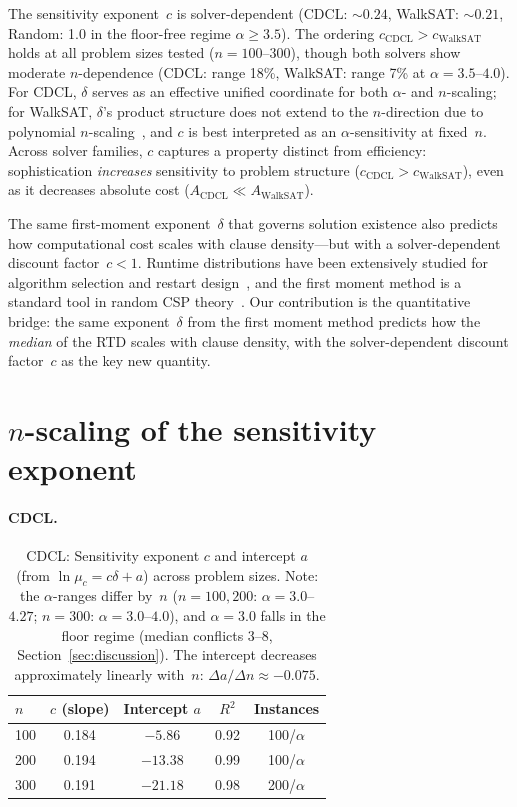 \documentclass[11pt,a4paper]{article}
\newcommand{\mc}{\mu_c}
\begin{document}
The sensitivity exponent~$c$ is solver-dependent
(CDCL: ${\sim}0.24$, WalkSAT: ${\sim}0.21$, Random: 1.0
in the floor-free regime $\alpha \geq 3.5$).
The ordering $c_{\text{CDCL}} > c_{\text{WalkSAT}}$ holds
at all problem sizes tested ($n = 100$--$300$),
though both solvers show moderate $n$-dependence
(CDCL: range 18\%, WalkSAT: range 7\%
at $\alpha = 3.5$--$4.0$).
For CDCL, $\delta$ serves as an effective unified coordinate
for both $\alpha$- and $n$-scaling;
for WalkSAT, $\delta$'s product structure does not extend
to the $n$-direction due to polynomial
$n$-scaling~\cite{MuHoos2015},
and $c$ is best interpreted as an $\alpha$-sensitivity at fixed~$n$.
Across solver families, $c$ captures a property distinct from
efficiency: sophistication \emph{increases} sensitivity to
problem structure ($c_{\text{CDCL}} > c_{\text{WalkSAT}}$),
even as it decreases absolute cost
($A_{\text{CDCL}} \ll A_{\text{WalkSAT}}$).

The same first-moment exponent~$\delta$ that governs
solution existence also predicts how computational cost
scales with clause density---but with a solver-dependent
discount factor~$c < 1$.
Runtime distributions have been extensively studied for algorithm
selection and restart design~\cite{Hoos1999,Frost1997,Gomes2000},
and the first moment method is a standard tool in random CSP
theory~\cite{MPZ2009}.
Our contribution is the quantitative bridge: the same
exponent~$\delta$ from the first moment method predicts
how the \emph{median} of the RTD scales with clause density,
with the solver-dependent discount factor~$c$ as the key
new quantity.


\appendix

\section{$n$-scaling of the sensitivity exponent}
\label{app:n_scaling}
\label{sec:n_scaling}

\paragraph{CDCL.}

\begin{table}[h]
\centering
\begin{tabular}{lcccc}
\toprule
$n$ & $c$ (slope) & Intercept $a$ & $R^2$ & Instances \\
\midrule
100 & 0.184 & $-5.86$  & 0.92 & 100/$\alpha$ \\
200 & 0.194 & $-13.38$ & 0.99 & 100/$\alpha$ \\
300 & 0.191 & $-21.18$ & 0.98 & 200/$\alpha$ \\
\bottomrule
\end{tabular}
\caption{CDCL: Sensitivity exponent $c$ and intercept $a$
(from $\ln \mc = c\delta + a$) across problem sizes.
Note: the $\alpha$-ranges differ by~$n$
($n = 100{,}200$: $\alpha = 3.0$--$4.27$;
$n = 300$: $\alpha = 3.0$--$4.0$),
and $\alpha = 3.0$ falls in the floor regime
(median conflicts 3--8, Section~\ref{sec:discussion}).
The intercept decreases approximately linearly
with~$n$: $\Delta a / \Delta n \approx -0.075$.}
\label{tab:n_scaling}
\end{table}
\end{document}
